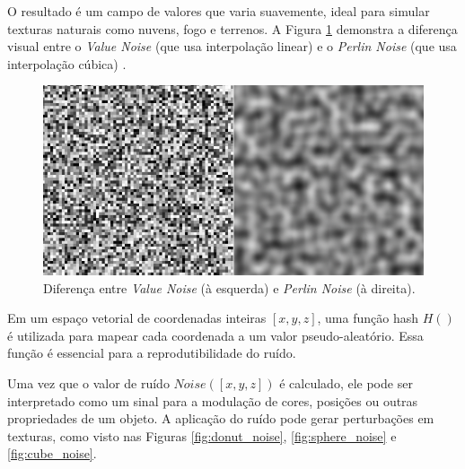 O resultado é um campo de valores que varia suavemente, ideal para simular texturas naturais como nuvens, fogo e terrenos. A Figura \ref{fig:whitenoise} demonstra a diferença visual entre o \textit{Value Noise} (que usa interpolação linear) e o \textit{Perlin Noise} (que usa interpolação cúbica) \cite{fractalNoise}.

\begin{figure}[H]
    \centering
    \includegraphics[width=0.8\linewidth]{img/noise-whitenoise.png}
    \caption{Diferença entre \textit{Value Noise} (à esquerda) e \textit{Perlin Noise} (à direita).}
    \label{fig:whitenoise}
\end{figure}

Em um espaço vetorial de coordenadas inteiras $[x, y, z]$, uma função hash $H()$ é utilizada para mapear cada coordenada a um valor pseudo-aleatório. Essa função é essencial para a reprodutibilidade do ruído.

Uma vez que o valor de ruído $Noise([x, y, z])$ é calculado, ele pode ser interpretado como um sinal para a modulação de cores, posições ou outras propriedades de um objeto. A aplicação do ruído pode gerar perturbações em texturas, como visto nas Figuras \ref{fig:donut_noise}, \ref{fig:sphere_noise} e \ref{fig:cube_noise}.

